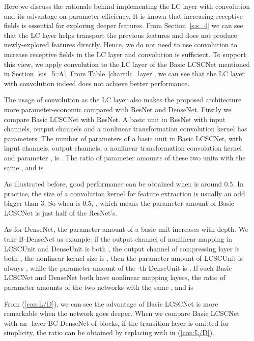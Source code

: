 \documentclass[journal]{IEEEtran}
\begin{document}
Here we discuss the rationale behind implementing the LC layer with  convolution and its advantage on parameter efficiency. It is known that increasing receptive fields is essential for exploring deeper features. From Section~\ref{s:s_4} we can see that the LC layer helps transport the previous features and does not produce newly-explored features directly. Hence, we do not need to use  convolution to increase receptive fields in the LC layer and  convolution is sufficient. To support this view, we apply  convolution to the LC layer of the Basic LCSCNet mentioned in Section~\ref{s:s_5::A}. From Table~\ref{chart:lc_layer}, we can see that the LC layer with  convolution indeed does not achieve better performance.

The usage of  convolution as the LC layer also makes the proposed architecture more parameter-economic compared with ResNet and DenseNet. Firstly we compare Basic LCSCNet with ResNet. A basic unit in ResNet with  input channels,  output channels and a  nonlinear transformation convolution kernel has  parameters. The number of parameters of a basic unit in Basic LCSCNet, with  input channels,  output channels, a  nonlinear transformation convolution kernel and parameter , is . The ratio of parameter amounts of these two units with the same ,  and  is 

As illustrated before, good performance can be obtained when  is around 0.5. In practice, the size of a convolution kernel for feature extraction is usually an odd bigger than 3. So when  is 0.5, , which means the parameter amount of Basic LCSCNet is just half of the ResNet's. 

As for DenseNet, the parameter amount of a basic unit increases with depth. We take B-DenseNet as example: if the output channel of nonlinear mapping in LCSCUnit and DenseUnit is both , the output channel of  compressing layer is both , the nonlinear kernel size is , then the parameter amount of LCSCUnit is always  , while the parameter amount of the -th DenseUnit is . If such Basic LCSCNet and DenseNet both have  nonlinear mapping layers, the ratio of parameter amounts of the two networks with the same ,  and  is 

From (\ref{con:L/D}), we can see the advantage of Basic LCSCNet is more remarkable when the network goes deeper. 
When we compare Basic LCSCNet with an -layer BC-DenseNet of  blocks, if the transition layer is omitted for simplicity, the ratio can be obtained by replacing  with  in (\ref{con:L/D}).
\end{document}
